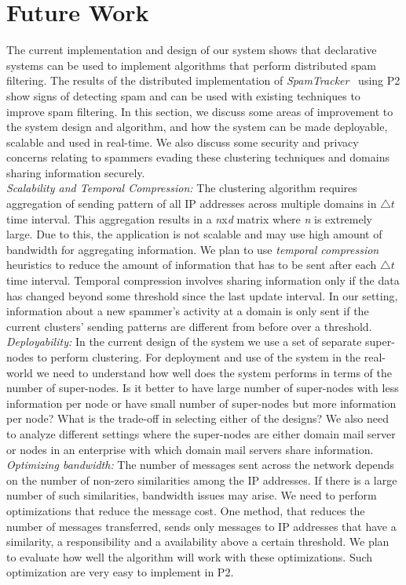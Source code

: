 \section{Future Work}
\label{future}
The current implementation and design of our system shows that declarative systems can be used to implement algorithms that perform distributed spam filtering. The results of the distributed implementation of \emph{SpamTracker}~\cite{bb} using P2 show signs of detecting spam and can be used with existing techniques to improve spam filtering. In this section, we discuss some areas of improvement to the system design and algorithm, and how the system can be made deployable, scalable and used in real-time. We also discuss some security and privacy concerns relating to spammers evading these clustering techniques and domains sharing information securely.\\ 
\emph{Scalability and Temporal Compression:} The clustering algorithm requires aggregation of sending pattern of all IP addresses across multiple domains in \emph{$\bigtriangleup t$} time interval. This aggregation results in a \emph{n}x\emph{d} matrix where \emph{n} is extremely large. Due to this, the application is not scalable and may use high amount of bandwidth for aggregating information. We plan to use \emph{temporal compression} \cite{baysail} heuristics to reduce the amount of information that has to be sent after each \emph{$\bigtriangleup t$} time interval. Temporal compression involves sharing information only if the data has changed beyond some threshold since the last update interval. In our setting, information about a new spammer's activity at a domain is only sent if the current clusters' sending patterns are different from before over a threshold.\\
\emph{Deployability:} In the current design of the system we use a set of separate super-nodes to perform clustering. For deployment and use of the system in the real-world we need to understand how well does the system performs in terms of the number of super-nodes. Is it better to have large number of super-nodes with less information per node or have small number of super-nodes but more information per node? What is the trade-off in selecting either of the designs? We also need to analyze different settings where the super-nodes are either domain mail server or nodes in an enterprise with which domain mail servers share information.\\
\emph{Optimizing bandwidth:} The number of messages sent across  the network depends on the number of non-zero similarities among the IP addresses. If there is a large number of such similarities, bandwidth issues may arise. We need to perform optimizations that reduce the message cost. One method, that reduces the number of messages transferred, sends only messages to IP addresses that have a similarity, a responsibility and a availability above a certain threshold. We plan to evaluate how well the algorithm will work with these optimizations. Such optimization are very easy to implement in P2.\\
